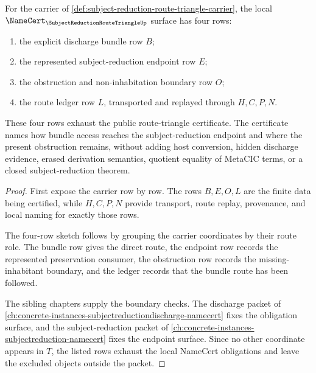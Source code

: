 \begin{theorem}
\label{thm:subject-reduction-route-triangle-namecert-obligations}
For the carrier of \autoref{def:subject-reduction-route-triangle-carrier}, the
local $\NameCert_{\SubjectReductionRouteTriangleUp}$ surface has four rows:
\begin{enumerate}
\item the explicit discharge bundle row $B$;
\item the represented subject-reduction endpoint row $E$;
\item the obstruction and non-inhabitation boundary row $O$;
\item the route ledger row $L$, transported and replayed through $H,C,P,N$.
\end{enumerate}
These four rows exhaust the public route-triangle certificate. The certificate
names how bundle access reaches the subject-reduction endpoint and where the
present obstruction remains, without adding host conversion, hidden discharge
evidence, erased derivation semantics, quotient equality of MetaCIC terms, or
a closed subject-reduction theorem.
\end{theorem}
\begin{proof}
First expose the carrier row by row. The rows $B,E,O,L$ are the finite data
being certified, while $H,C,P,N$ provide transport, route replay, provenance,
and local naming for exactly those rows.

The four-row sketch follows by grouping the carrier coordinates by their route
role. The bundle row gives the direct route, the endpoint row records the
represented preservation consumer, the obstruction row records the
missing-inhabitant boundary, and the ledger records that the bundle route has
been followed.

The sibling chapters supply the boundary checks. The discharge packet of
\autoref{ch:concrete-instances-subjectreductiondischarge-namecert} fixes the
obligation surface, and the subject-reduction packet of
\autoref{ch:concrete-instances-subjectreduction-namecert} fixes the endpoint
surface. Since no other coordinate appears in $T$, the listed rows exhaust the
local NameCert obligations and leave the excluded objects outside the packet.
\end{proof}


